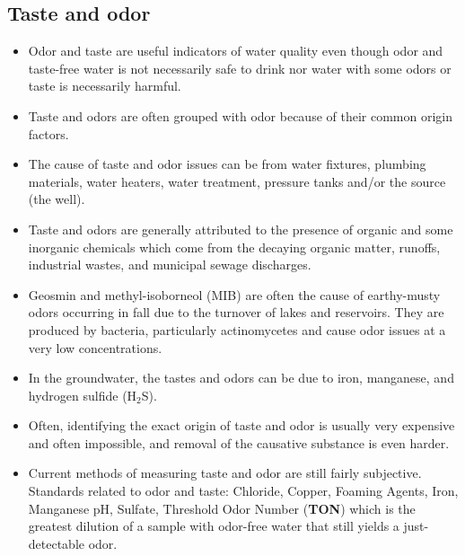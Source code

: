 \subsection{Taste and odor}
\begin{itemize}
\item Odor and taste are useful indicators of water quality even though odor and taste-free water is not necessarily safe to drink nor water with some odors or taste is necessarily harmful.
\item Taste and odors are often grouped with odor because of their common origin factors. 
\item The cause of taste and odor issues can be from water fixtures, plumbing materials, water heaters, water treatment, pressure tanks and/or the source (the well).
\item Taste and odors are generally attributed to the presence of organic and some inorganic chemicals which come from the decaying organic matter, runoffs, industrial wastes, and municipal sewage discharges. 
\item Geosmin and methyl-isoborneol (MIB) are often the cause of earthy-musty odors occurring in fall due to the turnover of lakes and reservoirs.  They are produced by bacteria, particularly actinomycetes and cause odor issues at a very low concentrations.
\item In the groundwater, the tastes and odors can be due to iron, manganese, and hydrogen sulfide (H$_2$S).
\item Often, identifying the exact origin of taste and odor is usually very expensive and often impossible, and removal of the causative substance is even harder.
\item Current methods of measuring taste and odor are still fairly subjective.  Standards related to odor and taste: Chloride, Copper, Foaming Agents, Iron, Manganese pH, Sulfate, Threshold Odor Number (\textbf{TON}) which is the greatest dilution of a sample with odor-free water that still yields a just-detectable odor.
\end{itemize}

